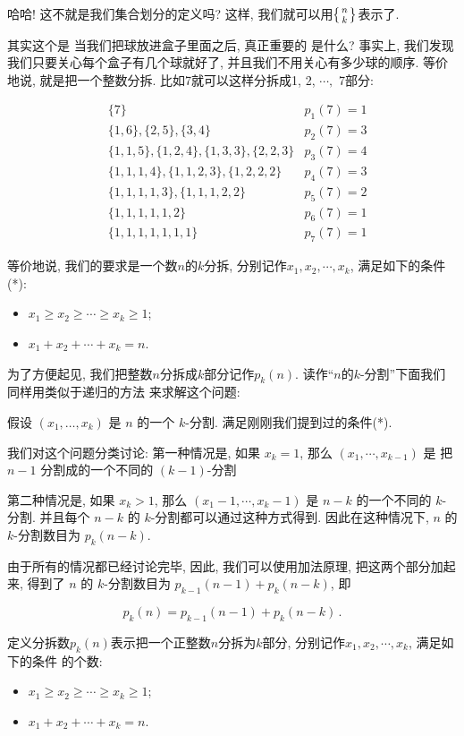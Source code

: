 哈哈! 这不就是我们集合划分的定义吗? 
这样, 我们就可以用$\left\{{n \atop k}\right\}$表示了.

 其实这个是
当我们把球放进盒子里面之后, 真正重要的
是什么? 事实上, 我们发现我们只要关心每个盒子有几个球就好了, 并且我们不用关心有多少球的顺序. 
等价地说, 就是把一个整数分拆. 比如7就可以这样分拆成1, 2, $\cdots,$ 7部分:

$$
\begin{aligned}
&\{7\}
& p_1(7)=1\\
&\{1,6\},\{2,5\},\{3,4\}
& p_2(7)=3\\
&\{1,1,5\}, \{1,2,4\}, \{1,3,3\}, \{2,2,3\} 
& p_3(7)=4\\
&\{1,1,1,4\},\{1,1,2,3\}, \{1,2,2,2\}
& p_4(7)=3\\
&\{1,1,1,1,3\},\{1,1,1,2,2\}
& p_5(7)=2\\
&\{1,1,1,1,1,2\}
& p_6(7)=1\\
&\{1,1,1,1,1,1,1\}
& p_7(7)=1
\end{aligned}
$$

等价地说, 我们的要求是一个数$n$的$k$分拆, 分别记作$x_1, x_2, \cdots, x_k$, 满足如下的条件(*): 
\begin{itemize}[noitemsep]
  \item  $x_1\ge x_2\ge\cdots\ge x_k\ge 1$;
  \item $x_1+x_2+\cdots+x_k=n$.
\end{itemize}

为了方便起见, 我们把整数$n$分拆成$k$部分记作$p_k(n)$. 读作``$n$的$k$-分割''下面我们同样用类似于递归的方法
来求解这个问题: 

假设 \((x_1,\ldots,x_k)\) 是 \(n\) 的一个 \(k\)-分割. 满足刚刚我们提到过的条件(*).

我们对这个问题分类讨论: 第一种情况是, 如果 \(x_k = 1\),
那么 \((x_1,\cdots,x_{k-1})\) 是 把\(n-1\) 分割成的一个不同的 \((k-1)\)-分割

第二种情况是, 如果 \(x_k > 1\), 那么 \((x_1-1,\cdots,x_{k}-1)\) 是 \(n-k\) 
的一个不同的 \(k\)-分割. 并且每个 \(n-k\) 的 \(k\)-分割都可以通过这种方式得到. 
因此在这种情况下, \(n\) 的 \(k\)-分割数目为 \(p_k(n-k)\). 

由于所有的情况都已经讨论完毕, 因此, 我们可以使用加法原理, 把这两个部分加起来, 得到了
\(n\) 的 \(k\)-分割数目为 \(p_{k-1}(n-1) + p_k(n-k)\), 即

\[p_k(n)=p_{k-1}(n-1)+p_k(n-k)\,.\]

\begin{definition}[分拆数]
  定义分拆数$p_k(n)$表示把一个正整数$n$分拆为$k$部分, 分别记作$x_1, x_2, \cdots, x_k$, 满足如下的条件
  的个数: 
  \begin{itemize}[noitemsep]
    \item  $x_1\ge x_2\ge\cdots\ge x_k\ge 1$;
    \item $x_1+x_2+\cdots+x_k=n$.
  \end{itemize}
\end{definition}

